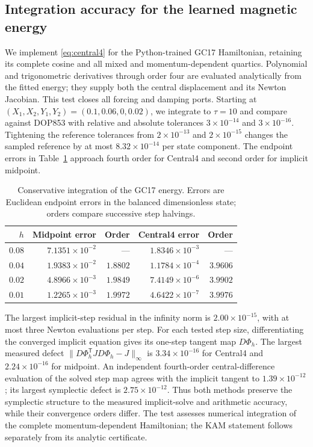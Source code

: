 \subsection{Integration accuracy for the learned magnetic energy}
\label{app:unified-integrator-check}
We implement \eqref{eq:central4} for the Python-trained GC17 Hamiltonian,
retaining its complete cosine and all mixed and momentum-dependent
quartics. Polynomial and trigonometric derivatives through order four
are evaluated analytically from the fitted energy; they supply both the
central displacement and its Newton Jacobian. This test closes all
forcing and damping ports. Starting at $(X_1,X_2,Y_1,Y_2)=(0.1,0.06,0,0.02)$,
we integrate to $\tau=10$ and compare against DOP853 with relative and
absolute tolerances $3\times10^{-14}$ and $3\times10^{-16}$.
Tightening the reference tolerances from $2\times10^{-13}$ and
$2\times10^{-15}$ changes the sampled reference by at most
$8.32\times10^{-14}$ per state component.
The endpoint errors in Table~\ref{tab:unified-integrator-check} approach
fourth order for Central4 and second order for implicit midpoint.

\begin{table}[htbp]
\centering\small
\setlength{\tabcolsep}{2.5pt}
\caption{Conservative integration of the GC17 energy.
Errors are Euclidean endpoint errors in the balanced dimensionless state;
orders compare successive step halvings.}
\label{tab:unified-integrator-check}
\begin{tabular}{rrrrr}
\toprule
$h$ & Midpoint error & Order & Central4 error & Order\\
\midrule
$0.08$ & $7.1351\times10^{-2}$ & --- & $1.8346\times10^{-3}$ & ---\\
$0.04$ & $1.9383\times10^{-2}$ & $1.8802$ & $1.1784\times10^{-4}$ & $3.9606$\\
$0.02$ & $4.8966\times10^{-3}$ & $1.9849$ & $7.4149\times10^{-6}$ & $3.9902$\\
$0.01$ & $1.2265\times10^{-3}$ & $1.9972$ & $4.6422\times10^{-7}$ & $3.9976$\\
\bottomrule
\end{tabular}
\end{table}

The largest implicit-step residual in the infinity norm is
$2.00\times10^{-15}$, with at most three Newton evaluations per step.
For each tested step size, differentiating the converged implicit equation
gives its one-step tangent map $D\Phi_h$. The largest measured defect
$\|D\Phi_h^{\mathsf T}JD\Phi_h-J\|_\infty$ is
$3.34\times10^{-16}$ for Central4 and $2.24\times10^{-16}$ for midpoint.
An independent fourth-order central-difference evaluation of the solved
step map agrees with the implicit tangent to $1.39\times10^{-12}$;
its largest symplectic defect is $2.75\times10^{-12}$.
Thus both methods preserve the symplectic structure to the measured
implicit-solve and arithmetic accuracy, while their convergence orders
differ. The test assesses numerical integration of the complete
momentum-dependent Hamiltonian; the KAM statement follows separately
from its analytic certificate.
